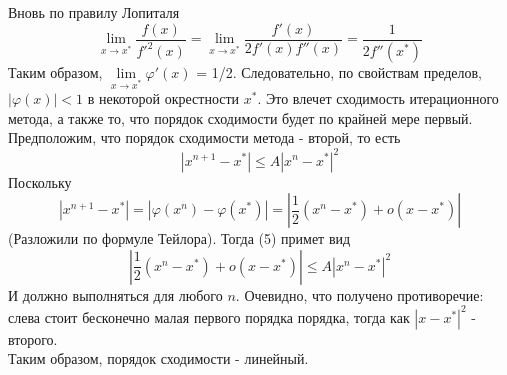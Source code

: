 \documentclass[12pt,a4paper]{article}
\begin{document}
\begin{description}[font=$\bullet$~\normalfont\scshape\color{red!50!black}]
\begin{equation}
		\end{equation}
		Вновь по правилу Лопиталя
		$$
			\lim\limits_{x\to x^*}\frac{f(x)}{f'^2(x)} = \lim\limits_{x\to x^*}\frac{f'(x)}{2f'(x)f''(x)} = \frac{1}{2f''(x^*)}
		$$
		Таким образом, $\lim\limits_{x\to x^*}\varphi'(x)$ = 1/2. Следовательно, по свойствам пределов, $|\varphi(x)| < 1$ в некоторой окрестности $x^*$. Это влечет сходимость итерационного метода, а также то, что порядок сходимости будет по крайней мере первый. \\
		Предположим, что порядок сходимости метода - второй, то есть
		\begin{equation}
			|x^{n+1} - x^*| \leq A |x^n - x^*|^2
		\end{equation}
		Поскольку
		$$
			|x^{n+1} - x^*| = |\varphi(x^n) - \varphi(x^*)| = |\frac{1}{2} (x^n - x^*) + o(x - x^*)|
		$$
		(Разложили по формуле Тейлора).
		Тогда (5) примет вид
		\begin{equation}
			|\frac{1}{2} (x^n - x^*) + o(x - x^*)| \leq A |x^n - x^*|^2
		\end{equation}
		И должно выполняться для любого $n$. Очевидно, что получено противоречие: слева стоит бесконечно малая первого порядка порядка, тогда как $|x - x^*|^2$ - второго. \\
		Таким образом, порядок сходимости - линейный.
	\end{description}
\end{document}
